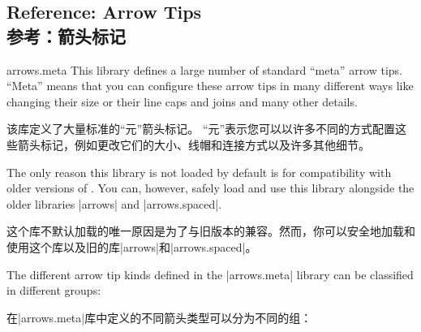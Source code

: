 \subsection{Reference: Arrow Tips\\参考：箭头标记}
\label{section-arrows-meta}

\begin{pgflibrary}{arrows.meta}
    This library defines a large number of standard ``meta'' arrow tips.
    ``Meta'' means that you can configure these arrow tips in many different
    ways like changing their size or their line caps and joins and many other
    details.

    该库定义了大量标准的“元”箭头标记。
    “元”表示您可以以许多不同的方式配置这些箭头标记，例如更改它们的大小、线帽和连接方式以及许多其他细节。


    The only reason this library is not loaded by default is for compatibility
    with older versions of \tikzname. You can, however, safely load and use
    this library alongside the older libraries |arrows| and |arrows.spaced|.

    这个库不默认加载的唯一原因是为了与旧版本的\tikzname 兼容。然而，你可以安全地加载和使用这个库以及旧的库|arrows|和|arrows.spaced|。
\end{pgflibrary}

The different arrow tip kinds defined in the |arrows.meta| library can be
classified in different groups:

在|arrows.meta|库中定义的不同箭头类型可以分为不同的组：

